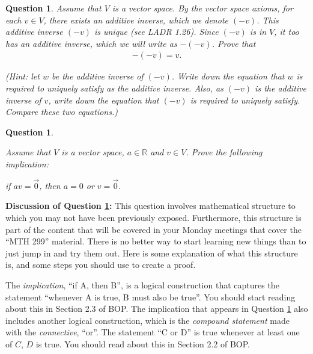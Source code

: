 \documentclass[12pt]{article}
\newtheorem{question}[thm]{Question}
\def\real{{\mathbb R}}
\begin{document}
\vspace{0.4cm}

\begin{question}
	\normalfont
	
	Assume that $V$ is a vector space.  By the vector space axioms, for each $v\in V$, there exists an additive inverse, which we denote $(-v)$. This additive inverse $(-v)$ is unique (see LADR 1.26). Since $(-v)$ is in $V$, it too has an additive inverse, which we will write as $-(-v)$.  Prove that
	\begin{align*}
		-(-v)=v.
	\end{align*}
	
	
	
\noindent (\emph{Hint}: let $w$ be the additive inverse of $(-v)$.  Write down the equation that $w$ is required to uniquely satisfy as the additive inverse.  Also, as $(-v)$ is the additive inverse of $v$, write down the equation that $(-v)$ is required to uniquely satisfy.  Compare these two equations.)
\end{question}


\vspace{0.4cm}

\begin{question}\label{que:IfAVZeroThen...}
	\normalfont
	
	Assume that $V$ is a vector space, $a\in\real$ and $v\in V$. Prove the following implication:
	
	\begin{center}
		if $av=\vec{0}$, then $a=0$ or $v=\vec{0}$.
	\end{center}
\end{question}

\textbf{Discussion of Question \ref{que:IfAVZeroThen...}:} This question involves mathematical structure to which you may not have been previously exposed.  Furthermore, this structure is part of the content that will be covered in your Monday meetings that cover the ``MTH 299'' material.  There is no better way to start learning new things than to just jump in and try them out.  Here is some explanation of what this structure is, and some steps you should use to create a proof.

The \emph{implication}, ``if A, then B'', is a logical construction that captures the statement ``whenever A is true, B must also be true''.  You should start reading about this in Section 2.3 of BOP.  The implication that appears in Question \ref{que:IfAVZeroThen...} also includes another logical construction, which is the \emph{compound statement} made with the \emph{connective}, ``or''.  The statement ``C or D'' is true whenever at least one of $C$, $D$ is true.  You should read about this in Section 2.2 of BOP.
\end{document}
